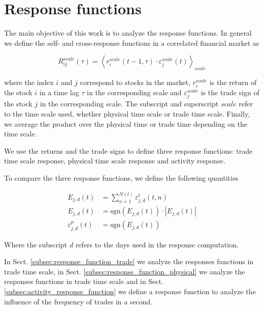 \section{Response functions}\label{sec:response_functions}

The main objective of this work is to analyze the response functions. In
general we define the self- and cross-response functions in a correlated
financial market as

\begin{equation}\label{eq:response_general}
    R^{scale}_{ij}\left(\tau\right)=\left\langle r^{scale}_{i}\left(t-1,
    \tau\right) \cdot\varepsilon^{scale}_{j} \left(t\right)\right\rangle
    _{scale}
\end{equation}

where the index $i$ and $j$ correspond to stocks in the market,
$r^{scale}_{i}$ is the return of the stock $i$ in a time lag $\tau$ in the
corresponding scale and $\varepsilon^{scale}_{j}$ is the trade sign of the
stock $j$ in the corresponding scale. The subscript and superscript $scale$
refer to the time scale used, whether physical time scale or trade time scale.
Finally, we average the product over the physical time or trade time depending
on the time scale.

We use the returns and the trade signs to define three response functions:
trade time scale response, physical time scale response and activity response.

To compare the three response functions, we define the following quantities

\begin{align}
    E_{j,d}\left(t\right)&=\sum_{n=1}^{N\left(t\right)}
    \varepsilon_{j,d}^{t}\left(t,n\right)\\
    E_{j,d}\left(t\right)&=\text{sgn}\left(E_{j,d}\left(t\right)\right)
    \cdot\left|E_{j,d}\left(t\right)\right|\\
    \varepsilon_{j,d}^{p}\left(t\right)&=
    \text{sgn}\left(E_{j,d}\left(t\right)\right)
\end{align}

Where the subscript $d$ refers to the days used in the response computation.

In Sect. \ref{subsec:response_function_trade} we analyze the responses
functions in trade time scale, in Sect. \ref{subsec:response_function_physical}
we analyze the responses functions in trade time scale and in Sect.
\ref{subsec:activity_response_function} we define a response function to
analyze the influence of the frequency of trades in a second.


